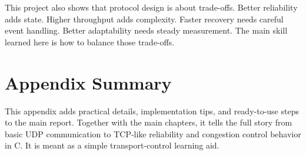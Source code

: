 This project also shows that protocol design is about trade-offs. Better
reliability adds state. Higher throughput adds complexity. Faster recovery
needs careful event handling. Better adaptability needs steady measurement.
The main skill learned here is how to balance those trade-offs.

\section{Appendix Summary}
This appendix adds practical details, implementation tips, and ready-to-use
steps to the main report. Together with the main chapters, it tells the full
story from basic UDP communication to TCP-like reliability and congestion
control behavior in C. It is meant as a simple transport-control learning aid.
